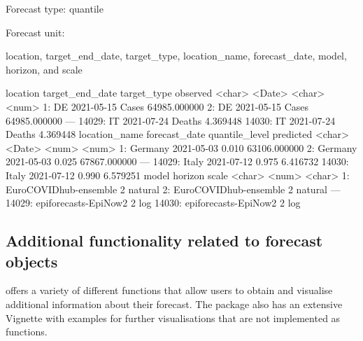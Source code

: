 \documentclass[
]{jss}
\begin{document}
\begin{CodeChunk}
\begin{CodeOutput}
Forecast type: quantile
\end{CodeOutput}
\begin{CodeOutput}
Forecast unit:
\end{CodeOutput}
\begin{CodeOutput}
location, target_end_date, target_type, location_name, forecast_date,
model, horizon, and scale
\end{CodeOutput}
\begin{CodeOutput}

       location target_end_date target_type     observed
         <char>          <Date>      <char>        <num>
    1:       DE      2021-05-15       Cases 64985.000000
    2:       DE      2021-05-15       Cases 64985.000000
   ---                                                  
14029:       IT      2021-07-24      Deaths     4.369448
14030:       IT      2021-07-24      Deaths     4.369448
       location_name forecast_date quantile_level    predicted
              <char>        <Date>          <num>        <num>
    1:       Germany    2021-05-03          0.010 63106.000000
    2:       Germany    2021-05-03          0.025 67867.000000
   ---                                                        
14029:         Italy    2021-07-12          0.975     6.416732
14030:         Italy    2021-07-12          0.990     6.579251
                       model horizon   scale
                      <char>   <num>  <char>
    1: EuroCOVIDhub-ensemble       2 natural
    2: EuroCOVIDhub-ensemble       2 natural
   ---                                      
14029:  epiforecasts-EpiNow2       2     log
14030:  epiforecasts-EpiNow2       2     log
\end{CodeOutput}
\end{CodeChunk}

\subsection{Additional functionality related to forecast
objects}\label{additional-functionality-related-to-forecast-objects}

 offers a variety of different functions that allow
users to obtain and visualise additional information about their
forecast. The package also has an extensive Vignette with examples for
further visualisations that are not implemented as functions.
\end{document}
